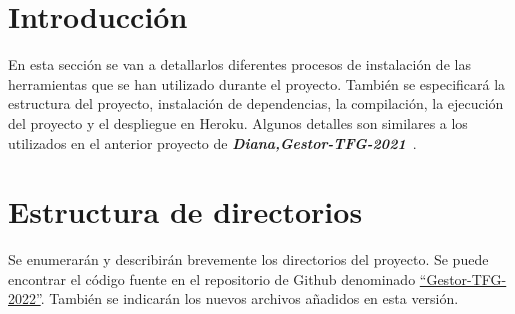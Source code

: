 
\section{Introducción}
En esta sección se van a detallarlos diferentes procesos de instalación de las herramientas que se han utilizado durante el proyecto. También se especificará la estructura del proyecto, instalación de dependencias, la compilación, la ejecución del proyecto y el despliegue en Heroku. 
Algunos detalles son similares a los utilizados en el anterior proyecto de \textbf{\textit{Diana,Gestor-TFG-2021}}~\cite{Gestor-TFG-2021}.

\section{Estructura de directorios}
Se enumerarán y describirán brevemente los directorios del proyecto. Se puede encontrar el código fuente en el repositorio de Github denominado \href{https://github.com/drg1006/gestor-tfg-2022}{``Gestor-TFG-2022''}. También se indicarán los nuevos archivos añadidos en esta versión.

